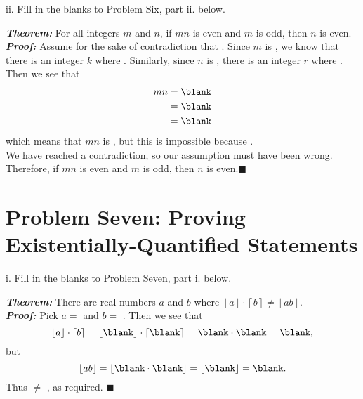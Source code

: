 \documentclass{article}
\renewcommand{\(}{\left(}
\renewcommand{\)}{\right)}
\newcommand{\floor}[1]{\left\lfloor#1\right\rfloor}
\newcommand{\ceil}[1]{\left\lceil#1\right\rceil}
\renewcommand\qedsymbol{$\blacksquare$}
\renewcommand{\emph}[1]{\textit{\textbf{#1}}}
\theoremstyle{plain}
\theoremstyle{plain}
\theoremstyle{definition}
\begin{document}
ii. Fill in the blanks to Problem Six, part ii. below.
\begin{center}
\begin{boxedminipage}{0.9\textwidth}
\emph{Theorem:} For all integers $m$ and $n$, if $mn$ is even and $m$ is odd, then $n$ is even. \\
\emph{Proof: } Assume for the sake of contradiction that \blank. Since $m$ is \blank, we know that there is an integer $k$ where \blank. Similarly, since $n$ is \blank, there is an integer $r$ where \blank. Then we see that
\begin{equation*}
\begin{split}
mn &= \blank \\
&= \blank \\
&= \blank
\end{split}
\end{equation*}
which means that $mn$ is \blank, but this is impossible because \blank.\\
We have reached a contradiction, so our assumption must have been wrong. Therefore, if $mn$ is even and $m$ is odd, then $n$ is even.\qedsymbol
\end{boxedminipage}
\end{center}

\newpage

\section*{Problem Seven: Proving Existentially-Quantified Statements}

i. Fill in the blanks to Problem Seven, part i. below.
\begin{center}
\begin{boxedminipage}{0.9\textwidth}
\emph{Theorem:} There are real numbers $a$ and $b$ where $\floor{a} \cdot \ceil{b} \not= \floor{ab}$. \\ \emph{Proof: } Pick $a = $ \blank and $b = $ \blank. Then we see that
\begin{equation*} \floor{a} \cdot \ceil{b} =
\floor{\blank} \cdot \ceil{\blank} =
\blank \cdot \blank =
\blank, \end{equation*}
but
\begin{equation*} \floor{ab} = \floor{\blank \cdot \blank} = \floor{\blank} = \blank. \end{equation*}
Thus \blank $\not=$ \blank, as required. \qedsymbol
\end{boxedminipage}
\end{center}
\end{document}

